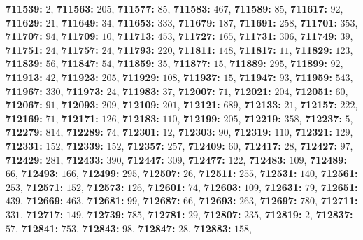 \textsf{\bfseries 711539:} $2$, \textsf{\bfseries 711563:} $205$, \textsf{\bfseries 711577:} $85$, \textsf{\bfseries 711583:} $467$, \textsf{\bfseries 711589:} $85$, \textsf{\bfseries 711617:} $92$, \textsf{\bfseries 711629:} $21$, \textsf{\bfseries 711649:} $34$, \textsf{\bfseries 711653:} $333$, \textsf{\bfseries 711679:} $187$, \textsf{\bfseries 711691:} $258$, \textsf{\bfseries 711701:} $353$, \textsf{\bfseries 711707:} $94$, \textsf{\bfseries 711709:} $10$, \textsf{\bfseries 711713:} $453$, \textsf{\bfseries 711727:} $165$, \textsf{\bfseries 711731:} $306$, \textsf{\bfseries 711749:} $39$, \textsf{\bfseries 711751:} $24$, \textsf{\bfseries 711757:} $24$, \textsf{\bfseries 711793:} $220$, \textsf{\bfseries 711811:} $148$, \textsf{\bfseries 711817:} $11$, \textsf{\bfseries 711829:} $123$, \textsf{\bfseries 711839:} $56$, \textsf{\bfseries 711847:} $54$, \textsf{\bfseries 711859:} $35$, \textsf{\bfseries 711877:} $15$, \textsf{\bfseries 711889:} $295$, \textsf{\bfseries 711899:} $92$, \textsf{\bfseries 711913:} $42$, \textsf{\bfseries 711923:} $205$, \textsf{\bfseries 711929:} $108$, \textsf{\bfseries 711937:} $15$, \textsf{\bfseries 711947:} $93$, \textsf{\bfseries 711959:} $543$, \textsf{\bfseries 711967:} $330$, \textsf{\bfseries 711973:} $24$, \textsf{\bfseries 711983:} $37$, \textsf{\bfseries 712007:} $71$, \textsf{\bfseries 712021:} $204$, \textsf{\bfseries 712051:} $60$, \textsf{\bfseries 712067:} $91$, \textsf{\bfseries 712093:} $209$, \textsf{\bfseries 712109:} $201$, \textsf{\bfseries 712121:} $689$, \textsf{\bfseries 712133:} $21$, \textsf{\bfseries 712157:} $222$, \textsf{\bfseries 712169:} $71$, \textsf{\bfseries 712171:} $126$, \textsf{\bfseries 712183:} $110$, \textsf{\bfseries 712199:} $205$, \textsf{\bfseries 712219:} $358$, \textsf{\bfseries 712237:} $5$, \textsf{\bfseries 712279:} $814$, \textsf{\bfseries 712289:} $74$, \textsf{\bfseries 712301:} $12$, \textsf{\bfseries 712303:} $90$, \textsf{\bfseries 712319:} $110$, \textsf{\bfseries 712321:} $129$, \textsf{\bfseries 712331:} $152$, \textsf{\bfseries 712339:} $152$, \textsf{\bfseries 712357:} $257$, \textsf{\bfseries 712409:} $60$, \textsf{\bfseries 712417:} $28$, \textsf{\bfseries 712427:} $97$, \textsf{\bfseries 712429:} $281$, \textsf{\bfseries 712433:} $390$, \textsf{\bfseries 712447:} $309$, \textsf{\bfseries 712477:} $122$, \textsf{\bfseries 712483:} $109$, \textsf{\bfseries 712489:} $66$, \textsf{\bfseries 712493:} $166$, \textsf{\bfseries 712499:} $295$, \textsf{\bfseries 712507:} $26$, \textsf{\bfseries 712511:} $255$, \textsf{\bfseries 712531:} $140$, \textsf{\bfseries 712561:} $253$, \textsf{\bfseries 712571:} $152$, \textsf{\bfseries 712573:} $126$, \textsf{\bfseries 712601:} $74$, \textsf{\bfseries 712603:} $109$, \textsf{\bfseries 712631:} $79$, \textsf{\bfseries 712651:} $439$, \textsf{\bfseries 712669:} $463$, \textsf{\bfseries 712681:} $99$, \textsf{\bfseries 712687:} $66$, \textsf{\bfseries 712693:} $263$, \textsf{\bfseries 712697:} $780$, \textsf{\bfseries 712711:} $331$, \textsf{\bfseries 712717:} $149$, \textsf{\bfseries 712739:} $785$, \textsf{\bfseries 712781:} $29$, \textsf{\bfseries 712807:} $235$, \textsf{\bfseries 712819:} $2$, \textsf{\bfseries 712837:} $57$, \textsf{\bfseries 712841:} $753$, \textsf{\bfseries 712843:} $98$, \textsf{\bfseries 712847:} $28$, \textsf{\bfseries 712883:} $158$, 
